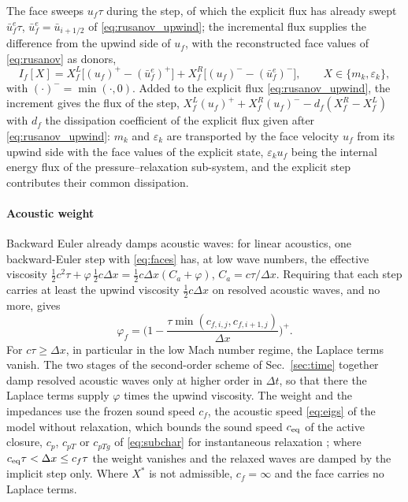 The face sweeps $u_f\tau$ during the step, of which the explicit flux has already swept $\bar u^e_f\tau$, $\bar u^e_f=\bar u_{i+1/2}$ of \eqref{eq:rusanov_upwind}; the
incremental flux supplies the difference from the upwind side of $u_f$, with the reconstructed face values of
\eqref{eq:rusanov} as donors,
\begin{equation}
I_f[X]=X^L_f\big[(u_f)^+-(\bar u^e_f)^+\big]+X^R_f\big[(u_f)^--(\bar u^e_f)^-\big],\qquad X\in\{m_k,\varepsilon_k\},
\label{eq:increment}
\end{equation}
with $(\cdot)^-=\min(\cdot,0)$. Added to the explicit flux \eqref{eq:rusanov_upwind}, the increment gives the flux of the step,
$X^L_f(u_f)^++X^R_f(u_f)^--d_f(X^R_f-X^L_f)$ with $d_f$ the dissipation coefficient of the explicit flux given after \eqref{eq:rusanov_upwind}: $m_k$ and $\varepsilon_k$ are transported by the
face velocity $u_f$ from its upwind side with the face values of the explicit state, $\varepsilon_ku_f$ being the internal energy flux of the
pressure--relaxation sub-system, and the explicit step contributes their common dissipation.

\paragraph{Acoustic weight}
Backward Euler already damps acoustic waves: for linear acoustics, one backward-Euler step with \eqref{eq:faces} has, at low wave
numbers, the effective viscosity $\tfrac12c^2\tau+\varphi\,\tfrac12c\Delta x=\tfrac12c\Delta x(C_a+\varphi)$, $C_a=c\tau/\Delta x$. Requiring that each step carries at least
the upwind viscosity $\tfrac12c\Delta x$ on resolved acoustic waves, and no more, gives
\begin{equation}
\varphi_f=\Big(1-\frac{\tau\min(c_{f,i,j},c_{f,i+1,j})}{\Delta x}\Big)^+ .
\label{eq:weight}
\end{equation}
For $c\tau\ge\Delta x$, in particular in the low Mach number
regime, the Laplace terms vanish. The two stages of the second-order scheme of Sec.~\ref{sec:time} together damp resolved acoustic waves only at higher order in $\Delta t$, so
that there the Laplace terms supply $\varphi$ times the upwind viscosity. The weight and the impedances use the frozen sound speed
$c_f$, the acoustic speed \eqref{eq:eigs} of the model without relaxation, which bounds the sound speed $c_{\rm eq}$ of the active
closure, $c_p$, $c_{pT}$ or $c_{pTg}$ of \eqref{eq:subchar} for instantaneous relaxation \cite{FlattenLund2011}; where $c_{\rm eq}\tau<\Delta x\le c_f\tau$ the
weight vanishes and the relaxed waves are damped by the implicit step only. Where $X^*$ is not admissible, $c_f=\infty$ and the face carries no Laplace terms.

